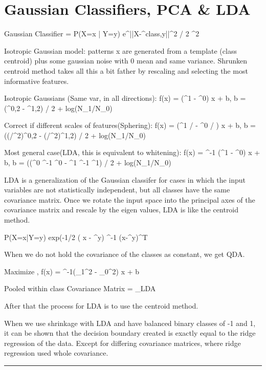 \documentclass[a4paper,twoside,twocolumn]{article}
\begin{document}
\section*{Gaussian Classifiers, PCA \& LDA}
\label{sec-9}
\setlength{\parindent}{0pt}
{\scriptsize

Gaussian Classifier = P(X=x | Y=y) \propto e^{||X-\mu^{class,y}||^2 / 2 \sigma^2}

Isotropic Gaussian model: patterns x are generated from a template (class centroid) plus some gaussian noise with 0 mean and same variance. Shrunken centroid method takes all this a bit father by rescaling and selecting the most informative features.

Isotropic Gaussians (Same var, in all directions): f(x) = (\mu^1 - \mu^0) \cdot x + b, b = (\mu^{0,2} - \mu^{1,2}) / 2 + log(N_1/N_0)

Correct if different scales of features(Sphering): f(x) = (\mu^1 / \sigma - \mu^0 / \sigma) \cdot x + b, b = ((\mu/\sigma^2)^{0,2} -
(\mu/\sigma^2)^{1,2}) / 2 + log(N_1/N_0)

Most general case(LDA, this is equivalent to whitening): f(x) = \Sigma^{-1} (\mu^1 - \mu^0) \cdot x + b, b = ((\mu^0 \Sigma^{-1} \mu^0 - \mu^1 \Sigma^{-1} \mu^1) / 2 + log(N_1/N_0)

LDA is a generalization of the Gaussian classifer for cases in which the input variables are not statistically independent, but all classes have the same covariance matrix. Once we rotate the input space into the principal axes of the covariance matrix and rescale by the eigen values, LDA is like the centroid method.

P(X=x|Y=y) \propto exp(-1/2 ( x - \mu^y) \Sigma^-1 (x-\mu^y)^T

When we do not hold the covariance of the classes as constant, we get QDA.

Maximize ,  f(x) = \Sigma^{-1}(\mu_1^2 - \mu_0^2) \cdot x + b

Pooled within class Covariance Matrix = \Sigma_{LDA}

After that the process for LDA is to use the centroid method.

When we use shrinkage with LDA and have balanced binary classes of -1 and 1, it can be shown that the decision boundary created is exactly equal to the ridge regression of the data. Except for differing covariance matrices, where ridge regression used whole covariance.

\noindent\rule{8cm}{0.4pt}

}
\end{document}
